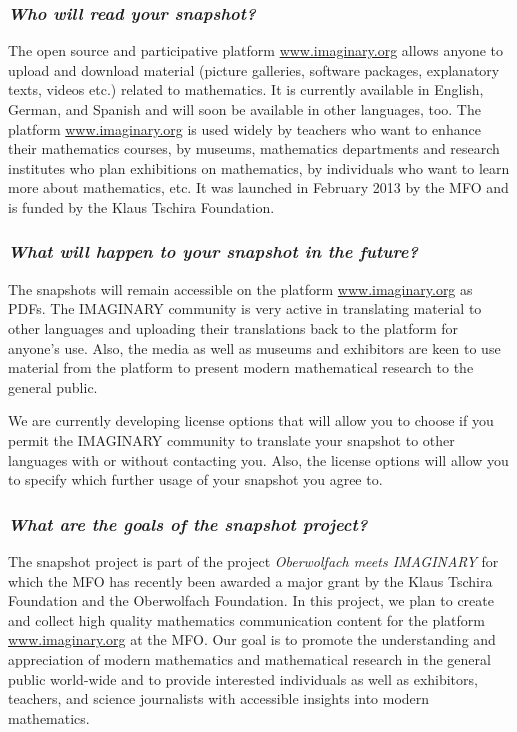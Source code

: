 \documentclass[a4paper,12pt]{article}
\begin{document}
\subsubsection*{\it Who will read your snapshot?}
The open source and participative platform \url{www.imaginary.org} allows anyone to upload and download material (picture galleries, software packages, explanatory texts, videos etc.) related to mathematics. It is currently available in English, German, and Spanish and will soon be available in other languages, too. The platform \url{www.imaginary.org} is used widely by teachers who want to enhance their mathematics courses, by museums, mathematics departments and research institutes who plan exhibitions on mathematics, by individuals who want to learn more about mathematics, etc. It was launched in February 2013 by the MFO and is funded by the Klaus Tschira Foundation.

\subsubsection*{\it What will happen to your snapshot in the future?}
The snapshots will remain accessible on the platform \url{www.imaginary.org} as PDFs. The IMAGINARY community is very active in translating material to other languages and uploading their translations back to the platform for anyone's use. Also, the media as well as museums and exhibitors are keen to use material from the platform to present modern mathematical research to the general public.

We are currently developing license options that will allow you to choose if you permit the IMAGINARY community to translate your snapshot to other languages with or without contacting you. Also, the license options will allow you to specify which further usage of your snapshot you agree to.

\subsubsection*{\it What are the goals of the snapshot project?}
The snapshot project is part of the project {\it Oberwolfach meets IMAGINARY} for which the MFO has recently been awarded a major grant by the Klaus Tschira Foundation and the Oberwolfach Foundation. In this project, we plan to create and collect high quality mathematics communication content for the platform \url{www.imaginary.org} at the MFO. Our goal is to promote the understanding and appreciation of modern mathematics and mathematical research in the general public world-wide and to provide interested individuals as well as exhibitors, teachers, and science journalists with accessible insights into modern mathematics.
\newpage
\end{document}
